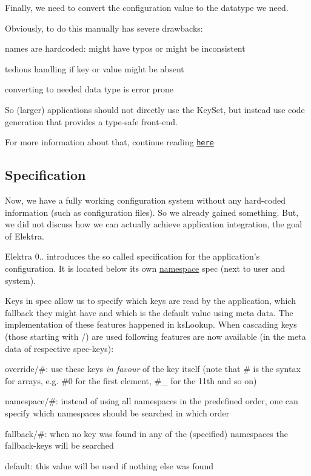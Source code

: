 Finally, we need to convert the configuration value to the datatype we need.

Obviously, to do this manually has severe drawbacks\+:


\begin{DoxyItemize}
\item names are hardcoded\+: might have typos or might be inconsistent
\item tedious handling if key or value might be absent
\item converting to needed data type is error prone
\end{DoxyItemize}

So (larger) applications should not directly use the {\ttfamily Key\+Set}, but instead use code generation that provides a type-\/safe front-\/end.

For more information about that, continue reading \href{https://github.com/ElektraInitiative/libelektra/tree/master/src/tools/gen}{\tt here}

\subsection*{Specification}

Now, we have a fully working configuration system without any hard-\/coded information (such as configuration files). So we already gained something. But, we did not discuss how we can actually achieve application integration, the goal of Elektra.

Elektra 0.. introduces the so called specification for the application's configuration. It is located below its own \hyperlink{md_doc_help_elektra-namespaces_doc_help_elektra-namespaces_md}{namespace} {\ttfamily spec} (next to user and system).

Keys in {\ttfamily spec} allow us to specify which keys are read by the application, which fallback they might have and which is the default value using meta data. The implementation of these features happened in {\ttfamily ks\+Lookup}. When cascading keys (those starting with {\ttfamily /}) are used following features are now available (in the meta data of respective {\ttfamily spec}-\/keys)\+:


\begin{DoxyItemize}
\item {\ttfamily override/\#}\+: use these keys {\itshape in favour} of the key itself (note that {\ttfamily \#} is the syntax for arrays, e.\+g. {\ttfamily \#0} for the first element, {\ttfamily \#\+\_} for the 11th and so on)
\item {\ttfamily namespace/\#}\+: instead of using all namespaces in the predefined order, one can specify which namespaces should be searched in which order
\item {\ttfamily fallback/\#}\+: when no key was found in any of the (specified) namespaces the {\ttfamily fallback}-\/keys will be searched
\item {\ttfamily default}\+: this value will be used if nothing else was found
\end{DoxyItemize}

